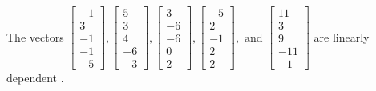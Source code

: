 \begin{exercise}
\begin{exerciseStatement}
  \end{exerciseStatement}
  \begin{exerciseAnswer}
   The vectors \(\left[\begin{array}{r}
-1 \\
3 \\
-1 \\
-1 \\
-5
\end{array}\right] , \left[\begin{array}{r}
5 \\
3 \\
4 \\
-6 \\
-3
\end{array}\right] , \left[\begin{array}{r}
3 \\
-6 \\
-6 \\
0 \\
2
\end{array}\right] , \left[\begin{array}{r}
-5 \\
2 \\
-1 \\
2 \\
2
\end{array}\right] , \text{ and } \left[\begin{array}{r}
11 \\
3 \\
9 \\
-11 \\
-1
\end{array}\right]\) are 
  	 linearly dependent  .
  


  \end{exerciseAnswer}
\end{exercise}
